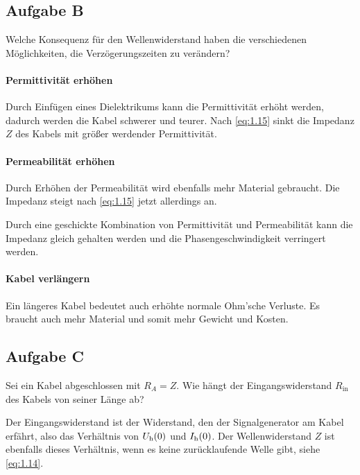 \subsection{Aufgabe B}

\begin{problem}
	Welche Konsequenz für den Wellenwiderstand haben die verschiedenen
	Möglichkeiten, die Verzögerungszeiten zu verändern?
\end{problem}

\paragraph{Permittivität erhöhen}

Durch Einfügen eines Dielektrikums kann die Permittivität erhöht werden,
dadurch werden die Kabel schwerer und teurer. Nach \eqref{eq:1.15} sinkt die
Impedanz $Z$ des Kabels mit größer werdender Permittivität.

\paragraph{Permeabilität erhöhen}

Durch Erhöhen der Permeabilität wird ebenfalls mehr Material gebraucht. Die
Impedanz steigt nach \eqref{eq:1.15} jetzt allerdings an.

Durch eine geschickte Kombination von Permittivität und Permeabilität kann die
Impedanz gleich gehalten werden und die Phasengeschwindigkeit verringert
werden.

\paragraph{Kabel verlängern}

Ein längeres Kabel bedeutet auch erhöhte normale Ohm'sche Verluste. Es braucht
auch mehr Material und somit mehr Gewicht und Kosten.

\subsection{Aufgabe C}

\begin{problem}
	Sei ein Kabel abgeschlossen mit $R_A = Z$. Wie hängt der Eingangswiderstand
	$R_\text{in}$ des Kabels von seiner Länge ab?
\end{problem}

Der Eingangswiderstand ist der Widerstand, den der Signalgenerator am Kabel
erfährt, also das Verhältnis von $U_\text h(0)$ und $I_\text h(0)$. Der
Wellenwiderstand $Z$ ist ebenfalls dieses Verhältnis, wenn es keine
zurücklaufende Welle gibt, siehe \eqref{eq:1.14}.

